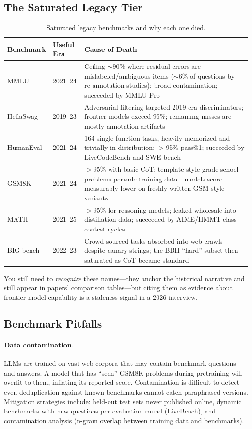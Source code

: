 \subsection{The Saturated Legacy Tier}
\label{sec:legacy_benchmarks}

\begin{table}[H]
\centering
\caption{Saturated legacy benchmarks and why each one died.}
\label{tab:legacy_benchmarks}
\begin{tabularx}{\textwidth}{@{}l l X@{}}
\toprule
\textbf{Benchmark} & \textbf{Useful Era} & \textbf{Cause of Death} \\
\midrule
MMLU      & 2021--24 & Ceiling $\sim$90\% where residual errors are mislabeled/ambiguous items ($\sim$6\% of questions by re-annotation studies); broad contamination; succeeded by MMLU-Pro \\
HellaSwag & 2019--23 & Adversarial filtering targeted 2019-era discriminators; frontier models exceed 95\%; remaining misses are mostly annotation artifacts \\
HumanEval & 2021--24 & 164 single-function tasks, heavily memorized and trivially in-distribution; $>$95\% pass@1; succeeded by LiveCodeBench and SWE-bench \\
GSM8K     & 2021--24 & $>$95\% with basic CoT; template-style grade-school problems pervade training data---models score measurably lower on freshly written GSM-style variants \\
MATH      & 2021--25 & $>$95\% for reasoning models; leaked wholesale into distillation data; succeeded by AIME/HMMT-class contest cycles \\
BIG-bench & 2022--23 & Crowd-sourced tasks absorbed into web crawls despite canary strings; the BBH ``hard'' subset then saturated as CoT became standard \\
\bottomrule
\end{tabularx}
\end{table}

You still need to \emph{recognize} these names---they anchor the historical
narrative and still appear in papers' comparison tables---but citing them as
evidence about frontier-model capability is a staleness signal in a 2026
interview.

\subsection{Benchmark Pitfalls}

\paragraph{Data contamination.}
LLMs are trained on vast web corpora that may contain benchmark questions and
answers.  A model that has ``seen'' GSM8K problems during pretraining will
overfit to them, inflating its reported score.  Contamination is difficult to
detect---even deduplication against known benchmarks cannot catch paraphrased
versions.  Mitigation strategies include: held-out test sets never published
online, dynamic benchmarks with new questions per evaluation round (LiveBench),
and contamination analysis (n-gram overlap between training data and benchmarks).

